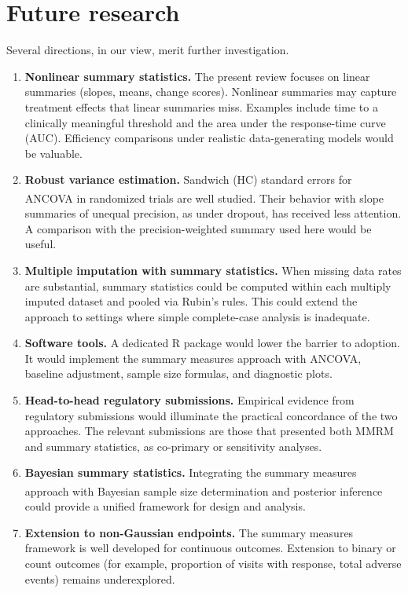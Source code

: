 \documentclass[
  11pt,
]{article}
\begin{document}
\section{Future research}\label{future-research}

Several directions, in our view, merit further investigation.

\begin{enumerate}
\def\labelenumi{\arabic{enumi}.}
\item
  \textbf{Nonlinear summary statistics.} The present review
  focuses on linear summaries (slopes, means, change scores).
  Nonlinear summaries may capture treatment effects that
  linear summaries miss. Examples include time to a
  clinically meaningful threshold and the area under the
  response-time curve (AUC). Efficiency comparisons under realistic
  data-generating models would be valuable.
\item
  \textbf{Robust variance estimation.} Sandwich (HC) standard
  errors for ANCOVA in randomized trials are well studied\textsuperscript{}. Their behavior
  with slope summaries of unequal precision, as under
  dropout, has received less attention. A comparison with
  the precision-weighted summary used here would be useful.
\item
  \textbf{Multiple imputation with summary statistics.} When
  missing data rates are substantial, summary statistics
  could be computed within each multiply imputed dataset and
  pooled via Rubin's rules. This could extend the approach
  to settings where simple complete-case analysis is
  inadequate.
\item
  \textbf{Software tools.} A dedicated R package would lower the
  barrier to adoption. It would implement the summary
  measures approach with ANCOVA, baseline adjustment, sample
  size formulas, and diagnostic plots.
\item
  \textbf{Head-to-head regulatory submissions.} Empirical
  evidence from regulatory submissions would illuminate the
  practical concordance of the two approaches. The relevant
  submissions are those that presented both MMRM and summary
  statistics, as co-primary or sensitivity analyses.
\item
  \textbf{Bayesian summary statistics.} Integrating the summary
  measures approach with Bayesian sample size determination\textsuperscript{} and posterior inference
  could provide a unified framework for design and analysis.
\item
  \textbf{Extension to non-Gaussian endpoints.} The summary
  measures framework is well developed for continuous
  outcomes. Extension to binary or count outcomes (for
  example, proportion of visits with response, total adverse
  events) remains underexplored.
\end{enumerate}
\end{document}
